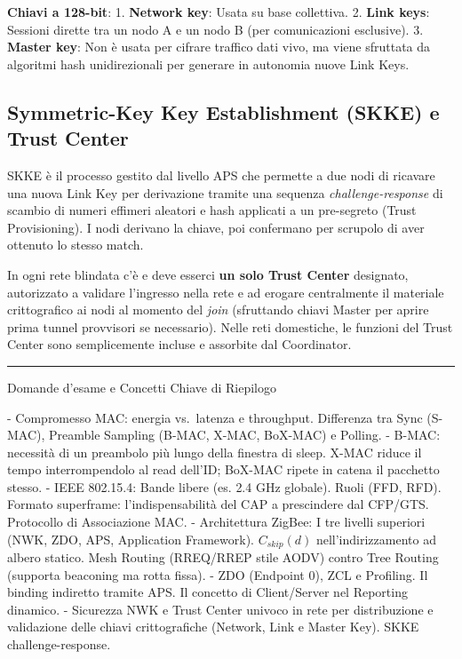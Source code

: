 \documentclass[
  italian,
  openany]{book}
\begin{document}
\textbf{Chiavi a 128-bit}: 1. \textbf{Network key}: Usata su base
collettiva. 2. \textbf{Link keys}: Sessioni dirette tra un nodo A e un
nodo B (per comunicazioni esclusive). 3. \textbf{Master key}: Non è
usata per cifrare traffico dati vivo, ma viene sfruttata da algoritmi
hash unidirezionali per generare in autonomia nuove Link Keys.

\subsection{Symmetric-Key Key Establishment (SKKE) e Trust
Center}\label{symmetric-key-key-establishment-skke-e-trust-center}

SKKE è il processo gestito dal livello APS che permette a due nodi di
ricavare una nuova Link Key per derivazione tramite una sequenza
\emph{challenge-response} di scambio di numeri effimeri aleatori e hash
applicati a un pre-segreto (Trust Provisioning). I nodi derivano la
chiave, poi confermano per scrupolo di aver ottenuto lo stesso match.

In ogni rete blindata c'è e deve esserci \textbf{un solo Trust Center}
designato, autorizzato a validare l'ingresso nella rete e ad erogare
centralmente il materiale crittografico ai nodi al momento del
\emph{join} (sfruttando chiavi Master per aprire prima tunnel provvisori
se necessario). Nelle reti domestiche, le funzioni del Trust Center sono
semplicemente incluse e assorbite dal Coordinator.

\begin{center}\rule{0.5\linewidth}{0.5pt}\end{center}

\begin{calloutnote}{Domande d’esame e Concetti Chiave di Riepilogo}

- Compromesso MAC: energia vs.~latenza e throughput. Differenza tra Sync
(S-MAC), Preamble Sampling (B-MAC, X-MAC, BoX-MAC) e Polling. - B-MAC:
necessità di un preambolo più lungo della finestra di sleep. X-MAC
riduce il tempo interrompendolo al read dell'ID; BoX-MAC ripete in
catena il pacchetto stesso. - IEEE 802.15.4: Bande libere (es. 2.4 GHz
globale). Ruoli (FFD, RFD). Formato superframe: l'indispensabilità del
CAP a prescindere dal CFP/GTS. Protocollo di Associazione MAC. -
Architettura ZigBee: I tre livelli superiori (NWK, ZDO, APS, Application
Framework). \(C_{skip}(d)\) nell'indirizzamento ad albero statico. Mesh
Routing (RREQ/RREP stile AODV) contro Tree Routing (supporta beaconing
ma rotta fissa). - ZDO (Endpoint 0), ZCL e Profiling. Il binding
indiretto tramite APS. Il concetto di Client/Server nel Reporting
dinamico. - Sicurezza NWK e Trust Center univoco in rete per
distribuzione e validazione delle chiavi crittografiche (Network, Link e
Master Key). SKKE challenge-response.

\end{calloutnote}
\end{document}
